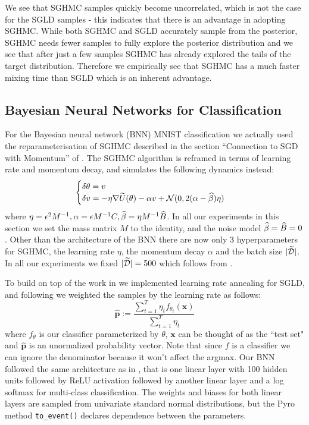 We see that SGHMC samples quickly become uncorrelated, which is not the case for the SGLD samples - this indicates that there is an advantage in adopting SGHMC. While both SGHMC and SGLD accurately sample from the posterior, SGHMC needs fewer samples to fully explore the posterior distribution and we see that after just a few samples SGHMC has already explored the tails of the target distribution. Therefore we empirically see that SGHMC has a much faster mixing time than SGLD which is an inherent advantage.

\subsection{Bayesian Neural Networks for Classification}
For the Bayesian neural network (BNN) MNIST classification we actually used the reparameterisation of SGHMC described in the section ``Connection to SGD with Momentum'' of \cite{sghmc}. The SGHMC algorithm is reframed in terms of learning rate and momentum decay, and simulates the following dynamics instead:
$$\begin{cases}
\delta \theta = v\\
\delta v = - \eta \nabla \widetilde{U}(\theta) - \alpha v + \mathcal{N}(0, 2(\alpha - \widehat{\beta}) \eta)
\end{cases}
$$
where $\eta = \epsilon^2 M^{-1}, \alpha = \epsilon M^{-1}C, \widehat{\beta} = \eta M^{-1}\widehat{B}$. In all our experiments in this section we set the mass matrix $M $ to the identity, and the noise model $\widehat{\beta} = \widehat{B} = 0$. Other than the architecture of the BNN there are now only 3 hyperparameters for SGHMC, the learning rate $\eta$, the momentum decay $\alpha$ and the batch size $|\widetilde{\mathcal{D}}|$. In all our experiments we fixed $|\widetilde{\mathcal{D}}| = 500$ which follows from \cite{sghmc}.

To build on top of the work in \cite{sghmc} we implemented learning rate annealing for SGLD, and following \cite{sgld} we weighted the samples by the learning rate as follows:
$$\mathbf{\hat p} := \frac{\sum^T_{t=1} \eta_t f_{\theta_t}(\textbf{x})}{\sum^T_{t=1} \eta_t}$$
where $f_\theta$ is our classifier parameterized by $\theta$, $\mathbf{x}$ can be thought of as the ``test set" and $\mathbf{\hat p}$ is an unormalized probability vector. Note that since $f$ is a classifier we can ignore the denominator because it won't affect the argmax. Our BNN followed the same architecture as in \cite{sghmc}, that is one linear layer with 100 hidden units followed by ReLU activation followed by another linear layer and a log softmax for multi-class classification. The weights and biases for both linear layers are sampled from univariate standard normal distributions, but the Pyro method \texttt{to\_event()} declares dependence between the parameters. 

